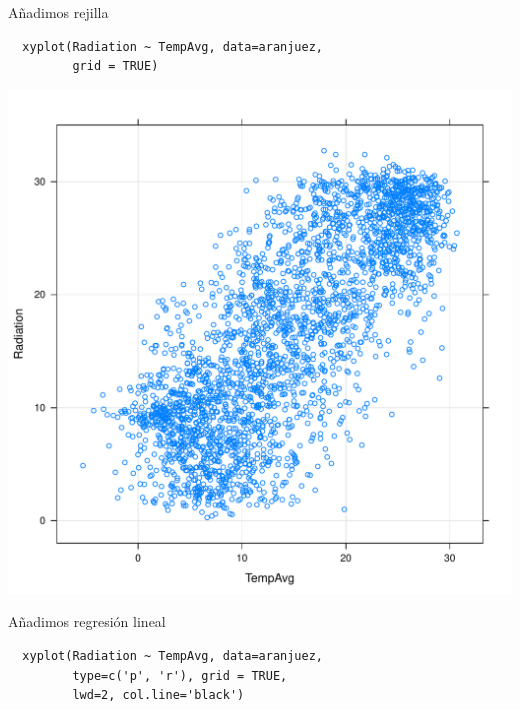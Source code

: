 \documentclass[xcolor={usenames,svgnames,dvipsnames}]{beamer}
\begin{document}
\begin{frame}[fragile,label=sec-2-1-4]{Añadimos rejilla}
 \lstset{language=R,label= ,caption= ,numbers=none}
\begin{lstlisting}
  xyplot(Radiation ~ TempAvg, data=aranjuez,
         grid = TRUE)
\end{lstlisting}
\end{frame}

\begin{frame}[label=sec-2-1-5]{}
\includegraphics[width=.9\linewidth]{figs/xyplotPG.pdf}
\end{frame}


\begin{frame}[fragile,label=sec-2-1-6]{Añadimos regresión lineal}
 \lstset{language=R,label= ,caption= ,numbers=none}
\begin{lstlisting}
  xyplot(Radiation ~ TempAvg, data=aranjuez,
         type=c('p', 'r'), grid = TRUE,
         lwd=2, col.line='black')
\end{lstlisting}
\end{frame}
\end{document}
